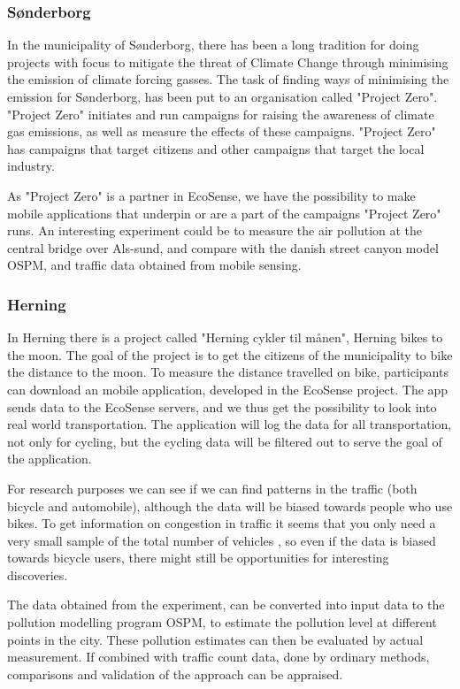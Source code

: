 \subsubsection{S\o nderborg}
In the municipality of S\o nderborg, there has been a long tradition for doing projects with focus to mitigate the threat of Climate Change through minimising the emission of climate forcing gasses. The task of finding ways of minimising the emission for S\o nderborg, has been put to an organisation called "Project Zero". "Project Zero" initiates and run campaigns for raising the awareness of climate gas emissions, as well as measure the effects of these campaigns. "Project Zero" has campaigns that target citizens and other campaigns that target the local industry.

As "Project Zero" is a partner in EcoSense, we have the possibility to make mobile applications that underpin or are a part of the campaigns "Project Zero" runs. An interesting experiment could be to measure the air pollution at the central bridge over Als-sund, and compare with the danish street canyon model OSPM, and traffic data obtained from mobile sensing.

\subsubsection{Herning}
In Herning there is a project called "Herning cykler til m\aa nen", Herning bikes to the moon. The goal of the project is to get the citizens of the municipality to bike the distance to the moon. To measure the distance travelled on bike, participants can download an mobile application, developed in the EcoSense project. The app sends data to the EcoSense servers, and we thus get the possibility to look into real world transportation. The application will log the data for all transportation, not only for cycling, but the cycling data will be filtered out to serve the goal of the application. 

For research purposes we can see if we can find patterns in the traffic (both bicycle and automobile), although the data will be biased towards people who use bikes. To get information on congestion in traffic it seems that you only need a very small sample of the total number of vehicles \cite{Herrera2010}, so even if the data is biased towards bicycle users, there might still be opportunities for interesting discoveries.

The data obtained from the experiment, can be converted into input data to the pollution modelling program OSPM, to estimate the pollution level at different points in the city. These pollution estimates can then be evaluated by actual measurement. If combined with traffic count data, done by ordinary methods, comparisons and validation of the approach can be appraised.

